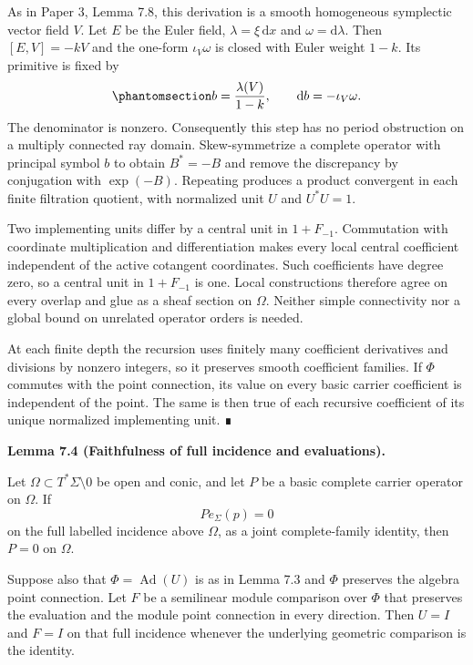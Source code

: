 \documentclass[
  english,
  11pt,
  reqno]{amsart}
\makeatletter
\newcommand{\pandocstatementheading}[1]{%
  \par\if@nobreak\else
    \addpenalty{\@beginparpenalty}%
    \addvspace{.5\baselineskip plus .2\baselineskip minus .2\baselineskip}%
  \fi
  {\normalfont\bfseries #1\par}%
  \nobreak\@afterindenttrue\@afterheading
}
\makeatother
\begin{document}
As in Paper 3, Lemma 7.8, this derivation is a smooth homogeneous
symplectic vector field \(V\). Let \(E\) be the Euler field,
\(\lambda=\xi\,\mathrm dx\) and \(\omega=\mathrm d\lambda\). Then
\([E,V]=-kV\) and the one-form \(\iota_V\omega\) is closed with Euler
weight \(1-k\). Its primitive is fixed by
\begin{equation}\protect\phantomsection\label{eq:global-negative-weight-primitive}{
b=\frac{\lambda(V)}{1-k},
\qquad
\mathrm db=-\iota_V\omega.
}\end{equation} The denominator is nonzero. Consequently this step has
no period obstruction on a multiply connected ray domain.
Skew-symmetrize a complete operator with principal symbol \(b\) to
obtain \(B^*=-B\) and remove the discrepancy by conjugation with
\(\exp(-B)\). Repeating produces a product convergent in each finite
filtration quotient, with normalized unit \(U\) and \(U^*U=1\).

Two implementing units differ by a central unit in \(1+F_{-1}\).
Commutation with coordinate multiplication and differentiation makes
every local central coefficient independent of the active cotangent
coordinates. Such coefficients have degree zero, so a central unit in
\(1+F_{-1}\) is one. Local constructions therefore agree on every
overlap and glue as a sheaf section on \(\Omega\). Neither simple
connectivity nor a global bound on unrelated operator orders is needed.

At each finite depth the recursion uses finitely many coefficient
derivatives and divisions by nonzero integers, so it preserves smooth
coefficient families. If \(\Phi\) commutes with the point connection,
its value on every basic carrier coefficient is independent of the
point. The same is then true of each recursive coefficient of its unique
normalized implementing unit. ∎

\pandocstatementheading{\protect{}\label{lem:global-full-incidence-faithfulness}Lemma 7.4 (Faithfulness of full incidence and evaluations).}

Let \(\Omega\subset T^*\Sigma\setminus0\) be open and conic, and let
\(P\) be a basic complete carrier operator on \(\Omega\). If \[
P e_\Sigma(p)=0
\] on the full labelled incidence above \(\Omega\), as a joint
complete-family identity, then \(P=0\) on \(\Omega\).

Suppose also that \(\Phi=\operatorname{Ad}(U)\) is as in Lemma 7.3 and
\(\Phi\) preserves the algebra point connection. Let \(F\) be a
semilinear module comparison over \(\Phi\) that preserves the evaluation
and the module point connection in every direction. Then \(U=I\) and
\(F=I\) on that full incidence whenever the underlying geometric
comparison is the identity.
\end{document}

